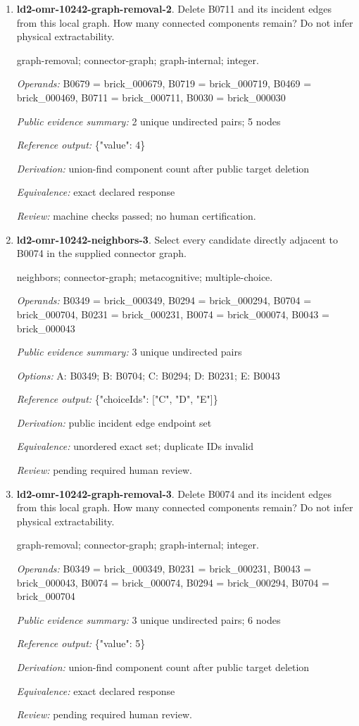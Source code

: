 \begin{enumerate}
\item \textbf{ld2-omr-10242-graph-removal-2}. Delete B0711 and its incident edges from this local graph. How many connected components remain? Do not infer physical extractability.
\par{\small graph-removal; connector-graph; graph-internal; integer.\par\textit{Operands:} B0679 = brick\_000679, B0719 = brick\_000719, B0469 = brick\_000469, B0711 = brick\_000711, B0030 = brick\_000030\par\textit{Public evidence summary:} 2 unique undirected pairs; 5 nodes\par\textit{Reference output:} \{"value": 4\}\par\textit{Derivation:} union-find component count after public target deletion\par\textit{Equivalence:} exact declared response\par\textit{Review:} machine checks passed; no human certification.}
\item \textbf{ld2-omr-10242-neighbors-3}. Select every candidate directly adjacent to B0074 in the supplied connector graph.
\par{\small neighbors; connector-graph; metacognitive; multiple-choice.\par\textit{Operands:} B0349 = brick\_000349, B0294 = brick\_000294, B0704 = brick\_000704, B0231 = brick\_000231, B0074 = brick\_000074, B0043 = brick\_000043\par\textit{Public evidence summary:} 3 unique undirected pairs\par\textit{Options:} A: B0349; B: B0704; C: B0294; D: B0231; E: B0043\par\textit{Reference output:} \{"choiceIds": ["C", "D", "E"]\}\par\textit{Derivation:} public incident edge endpoint set\par\textit{Equivalence:} unordered exact set; duplicate IDs invalid\par\textit{Review:} pending required human review.}
\item \textbf{ld2-omr-10242-graph-removal-3}. Delete B0074 and its incident edges from this local graph. How many connected components remain? Do not infer physical extractability.
\par{\small graph-removal; connector-graph; graph-internal; integer.\par\textit{Operands:} B0349 = brick\_000349, B0231 = brick\_000231, B0043 = brick\_000043, B0074 = brick\_000074, B0294 = brick\_000294, B0704 = brick\_000704\par\textit{Public evidence summary:} 3 unique undirected pairs; 6 nodes\par\textit{Reference output:} \{"value": 5\}\par\textit{Derivation:} union-find component count after public target deletion\par\textit{Equivalence:} exact declared response\par\textit{Review:} pending required human review.}

\end{enumerate}
